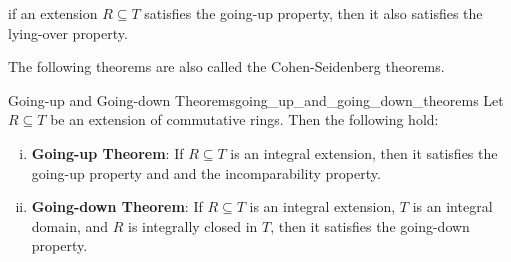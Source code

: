 \begin{proposition}{}{}
    if an extension $R \subseteq  T$ satisfies the going-up property, then it also satisfies the lying-over property.
\end{proposition}

The following theorems are also called the Cohen-Seidenberg theorems.
\begin{theorem}{Going-up and Going-down Theorems}{going_up_and_going_down_theorems}
    Let $R\subseteq T$ be an extension of commutative rings. Then the following hold:
    \begin{enumerate}[(i)]
        \item \textbf{Going-up Theorem}: If $R\subseteq T$ is an integral extension, then it satisfies the going-up property and and the incomparability property.
        \item \textbf{Going-down Theorem}: If $R\subseteq T$ is an integral extension, $T$ is an integral domain, and $R$ is integrally closed in $T$, then it satisfies the going-down property.
    \end{enumerate}
    
\end{theorem}
